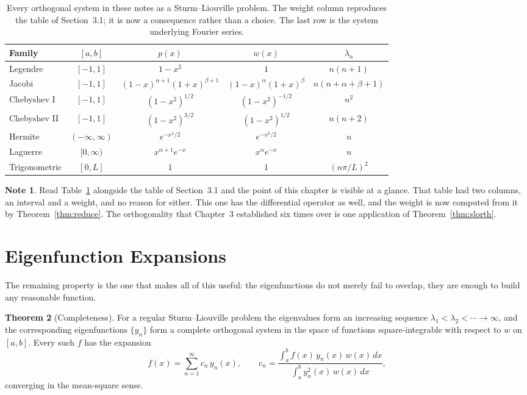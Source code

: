 \documentclass[12pt,a4paper]{report}
\theoremstyle{definition}
\newtheorem{thm}{Theorem}[section]
\newtheorem{note}[thm]{Note}
\theoremstyle{plain}
\begin{document}
\begin{table}[H]
\centering
\small
\begin{tabular}{|l|c|c|c|c|}
\hline
\textbf{Family} & $[a,b]$ & $p(x)$ & $w(x)$ & $\lambda_n$\\
\hline
Legendre & $[-1,1]$ & $1-x^{2}$ & $1$ & $n(n+1)$\\
Jacobi & $[-1,1]$ & $(1-x)^{\alpha+1}(1+x)^{\beta+1}$ & $(1-x)^{\alpha}(1+x)^{\beta}$ & $n(n+\alpha+\beta+1)$\\
Chebyshev I & $[-1,1]$ & $\left(1-x^{2}\right)^{1/2}$ & $\left(1-x^{2}\right)^{-1/2}$ & $n^{2}$\\
Chebyshev II & $[-1,1]$ & $\left(1-x^{2}\right)^{3/2}$ & $\left(1-x^{2}\right)^{1/2}$ & $n(n+2)$\\
Hermite & $(-\infty,\infty)$ & $e^{-x^{2}/2}$ & $e^{-x^{2}/2}$ & $n$\\
Laguerre & $[0,\infty)$ & $x^{\alpha+1}e^{-x}$ & $x^{\alpha}e^{-x}$ & $n$\\
\hline
Trigonometric & $[0,L]$ & $1$ & $1$ & $\left(n\pi/L\right)^{2}$\\
\hline
\end{tabular}
\caption{Every orthogonal system in these notes as a Sturm--Liouville problem.
The weight column reproduces the table of Section~3.1; it is now a consequence
rather than a choice. The last row is the system underlying Fourier series.}
\label{tab:slfamilies}
\end{table}

\begin{note}
Read Table~\ref{tab:slfamilies} alongside the table of Section~3.1 and the point
of this chapter is visible at a glance. That table had two columns, an interval
and a weight, and no reason for either. This one has the differential operator
as well, and the weight is now computed from it by Theorem~\ref{thm:reduce}. The
orthogonality that Chapter~3 established six times over is one application of
Theorem~\ref{thm:slorth}.
\end{note}

\section{Eigenfunction Expansions}

The remaining property is the one that makes all of this useful: the
eigenfunctions do not merely fail to overlap, they are enough to build any
reasonable function.

\begin{thm}[Completeness]
\label{thm:complete}
For a regular Sturm--Liouville problem the eigenvalues form an increasing
sequence $\lambda_1<\lambda_2<\cdots\to\infty$, and the corresponding
eigenfunctions $\{y_n\}$ form a complete orthogonal system in the space of
functions square-integrable with respect to $w$ on $[a,b]$. Every such $f$ has
the expansion
$$f(x) = \sum^{\infty}_{n=1}c_n\,y_n(x),
\qquad c_n = \frac{\displaystyle\int^{b}_{a}f(x)\,y_n(x)\,w(x)\,dx}
{\displaystyle\int^{b}_{a}y_n^{2}(x)\,w(x)\,dx},$$
converging in the mean-square sense.
\end{thm}
\end{document}
